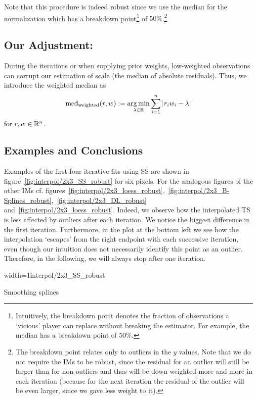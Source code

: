 {	Note that this procedure is indeed robust since we use the median for the normalization which has a breakdown point\footnote{Intuitively, the breakdown point denotes the fraction of observations a `vicious' player can replace without breaking the estimator. For example, the median has a breakdown point of $50 \%$.} of $50 \%$.\footnote{The breakdown point relates only to outliers in the $y$ values. Note that we do not require the {{IM}}s to be robust, since the residual for an outlier will  still be larger than for non-outliers and thus will be down weighted more and more in each iteration (because for the next iteration the residual of the outlier will be even larger, since we gave less weight to it).}
	\subsection{Our Adjustment:}{
		During the iterations or when supplying prior weights, low-weighted observations can corrupt our estimation of scale (the median of absolute residuals). Thus, we introduce the weighted median as
		$$
			\operatorname{med}_\text{weighted}(r,w) := \operatorname*{arg\, min}_{\lambda \in \mathbb{R}} \sum_{i=1}^n |r_iw_i -\lambda|
		$$
		for $r,w\in \mathbb{R}^n$. 
	}
	\subsection{Examples and Conclusions}{		
		Examples of the first four iterative fits using SS are shown in figure~\ref{fig:interpol/2x3_SS_robust} for six pixels. For the analogous figures of the other {{IM}}s cf. figures~\ref{fig:interpol/2x3_loess_robust},~\ref{fig:interpol/2x3_B-Splines_robust},~\ref{fig:interpol/2x3_DL_robust} and~\ref{fig:interpol/2x3_loess_robust}.
		Indeed, we observe how the interpolated {TS} is less affected by outliers after each iteration. We notice the biggest difference in the first iteration. Furthermore, in the plot at the bottom left we see how the interpolation `escapes' from the right endpoint with each successive iteration, even though our intuition does not necessarily identify this point as an outlier. Therefore, in the following, we will always stop after one iteration.

		\begin{my_figure}[h]{width=1\textwidth}{interpol/2x3_SS_robust}
			\caption[Smoothing splines robustification.]{Smoothing splines \RobItPlot}
			\label{fig:interpol/2x3_SS_robust}
		\end{my_figure}
	} 
	
}
